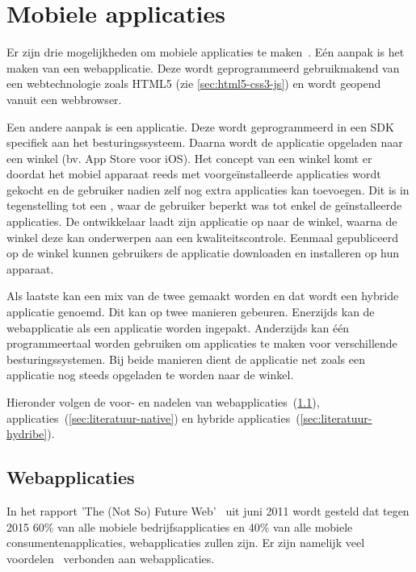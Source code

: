 
\section{Mobiele applicaties}
\label{sec:mobiele-applicaties}
Er zijn drie mogelijkheden om mobiele applicaties te maken~\cite{Accenture2012,Hales2012}. Eén aanpak is het maken van een webapplicatie.
Deze wordt geprogrammeerd gebruikmakend van een webtechnologie zoals HTML5 (zie \ref{sec:html5-css3-js}) en wordt geopend vanuit een webbrowser. 

Een andere aanpak is een  applicatie. 
Deze wordt geprogrammeerd in een SDK specifiek aan het besturingssysteem.
Daarna wordt de applicatie opgeladen naar een winkel (bv. App Store voor iOS).
Het concept van een winkel komt er doordat het mobiel apparaat reeds met voorgeïnstalleerde applicaties wordt gekocht en de gebruiker nadien zelf nog extra applicaties kan toevoegen.
Dit is in tegenstelling tot een , waar de gebruiker beperkt was tot enkel de geïnstalleerde applicaties. 
De ontwikkelaar laadt zijn applicatie op naar de winkel, waarna de winkel deze kan onderwerpen aan een kwaliteitscontrole.
Eenmaal gepubliceerd op de winkel kunnen gebruikers de applicatie downloaden en installeren op hun apparaat.

Als laatste kan een mix van de twee gemaakt worden en dat wordt een hybride applicatie genoemd.
Dit kan op twee manieren gebeuren.
Enerzijds kan de webapplicatie als een  applicatie worden ingepakt.
Anderzijds kan één programmeertaal worden gebruiken om  applicaties te maken voor verschillende besturingssystemen.
Bij beide manieren dient de applicatie net zoals een  applicatie nog steeds opgeladen te worden naar de winkel.

Hieronder volgen de voor- en nadelen van webapplicaties~(\ref{sec:literatuur-webapps}),  applicaties~(\ref{sec:literatuur-native}) en hybride applicaties~(\ref{sec:literatuur-hydribe}).

\subsection{Webapplicaties}
\label{sec:literatuur-webapps}
In het rapport 'The (Not So) Future Web'~\cite{Phifer2011} uit juni 2011 wordt gesteld dat tegen 2015 60\% van alle mobiele bedrijfsapplicaties en 40\% van alle mobiele consumentenapplicaties, webapplicaties zullen zijn. 
Er zijn namelijk veel voordelen~\cite{Accenture2012} verbonden aan webapplicaties.

